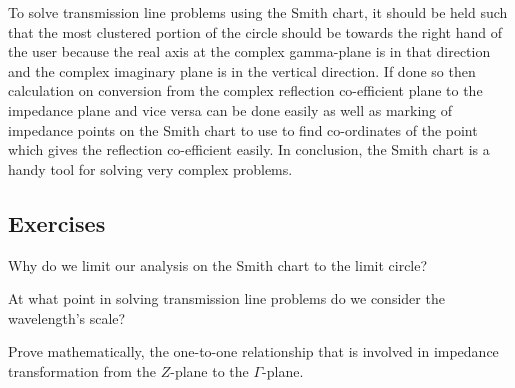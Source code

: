 To solve transmission line problems using the Smith chart, it should be held such that the most clustered portion of the circle should be towards the right hand of the user because the real axis at the complex gamma-plane is in that direction and the complex imaginary plane is in the vertical direction. If done so then calculation on conversion from the complex reflection co-efficient plane to the impedance plane and vice versa can be done easily as well as marking of impedance points on the Smith chart to use to find co-ordinates of the point which gives the reflection co-efficient easily. In conclusion, the Smith chart is a handy tool for solving very complex  problems.

\begin{mdframed}[ backgroundcolor=lightblue, linewidth=1pt, hidealllines=true]
\section*{Exercises}
\begin{ExerciseList}
\Exercise[label={ex32}]
Why do we limit our analysis on the Smith chart to the limit circle?


\Exercise[label={ex34}]
At what point in solving transmission line problems do we consider the wavelength's scale?

\Exercise[label={ex34}]
Prove mathematically, the one-to-one relationship that is involved in impedance transformation from the ${Z}$-plane to the $\Gamma$-plane.
\end{ExerciseList}
\end{mdframed}